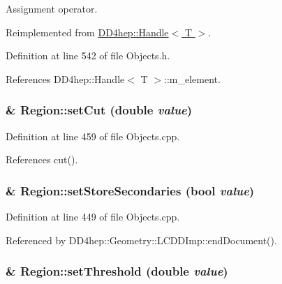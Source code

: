 Assignment operator. 

Reimplemented from \hyperlink{class_d_d4hep_1_1_handle_a9bbf8f498df42e81ad26fb00233505a6}{DD4hep::Handle$<$ T $>$}.

Definition at line 542 of file Objects.h.

References DD4hep::Handle$<$ T $>$::m\_\-element.\hypertarget{class_d_d4hep_1_1_geometry_1_1_region_ae4510bd7a92f89b49d161c67475c0350}{
\subsubsection[{setCut}]{ \& Region::setCut (double {\em value})}}
\label{class_d_d4hep_1_1_geometry_1_1_region_ae4510bd7a92f89b49d161c67475c0350}


Definition at line 459 of file Objects.cpp.

References cut().\hypertarget{class_d_d4hep_1_1_geometry_1_1_region_a491be77e5c4a5098fa1ae6acb8fac442}{
\subsubsection[{setStoreSecondaries}]{ \& Region::setStoreSecondaries (bool {\em value})}}
\label{class_d_d4hep_1_1_geometry_1_1_region_a491be77e5c4a5098fa1ae6acb8fac442}


Definition at line 449 of file Objects.cpp.

Referenced by DD4hep::Geometry::LCDDImp::endDocument().\hypertarget{class_d_d4hep_1_1_geometry_1_1_region_a29293fa51db7f4469c51a7638a77043a}{
\subsubsection[{setThreshold}]{ \& Region::setThreshold (double {\em value})}}
\label{class_d_d4hep_1_1_geometry_1_1_region_a29293fa51db7f4469c51a7638a77043a}


